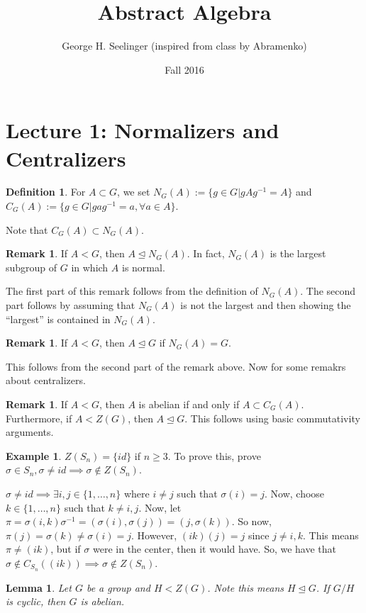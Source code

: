 \documentclass[11pt,leqno,oneside]{amsart}
\title[Abstract Algebra]{Abstract Algebra}
\author{George H. Seelinger (inspired from class by Abramenko)}
\date{Fall 2016}
\newcommand{\subgroup}{\mathrel{<}}
\newcommand{\normsubgroup}{\mathrel{\unlhd}}
\newtheorem{lem}[thm]{Lemma}
\theoremstyle{definition}
\newtheorem{defn}[thm]{Definition}
\newtheorem{example}[thm]{Example}
\newtheorem{rmk}[thm]{Remark}
\numberwithin{equation}{section}
\begin{document}
\maketitle
\section{Lecture 1: Normalizers and Centralizers}
\begin{defn}
    For $A \subset G$, we set $N_G(A) := \{g \in G | gAg^{-1} = A\}$ and
    $C_G(A) := \{g \in G | gag^{-1} = a, \forall a \in A\}$. 
\end{defn}
Note that $C_G(A) \subset N_G(A)$.
\begin{rmk}
    If $A \subgroup G$, then $A \normsubgroup N_G(A)$. In fact, $N_G(A)$ is the
    largest subgroup of $G$ in which $A$ is normal.
\end{rmk}
    The first part of this remark follows from the definition of $N_G(A)$. The
    second part follows by assuming that $N_G(A)$ is not the largest and then
    showing the ``largest'' is contained in $N_G(A)$.
\begin{rmk}
    If $A \subgroup G$, then $A \normsubgroup G$ if $N_G(A) = G$.
\end{rmk}
    This follows from the second part of the remark above.
    Now for some remakrs about centralizers.
    \begin{rmk}
        If $A \subgroup G$, then $A$ is abelian if and only if $A \subset
        C_G(A)$. Furthermore, if $A \subgroup Z(G)$, then $A \normsubgroup G$.
        This follows using basic commutativity arguments.
    \end{rmk}
    \begin{example}
        $Z(S_n) = \{ id \}$ if $n \geq 3$. To prove this, prove $\sigma \in S_n, \sigma \neq id \implies \sigma \notin Z(S_n)$. 

        $\sigma \neq id \implies \exists i,j \in \{1, \ldots, n\}$ where $i
        \neq j$ such that $\sigma(i) = j$. Now, choose $k \in \{1, \ldots, n\}$
        such that $k \neq i,j$. Now, let $\pi = \sigma(i,k)\sigma^{-1} =
        (\sigma(i), \sigma(j)) = (j, \sigma(k))$. So now, $\pi(j) = \sigma(k)
        \neq \sigma(i) = j$. However, $(ik)(j)=j$ since $j \neq i,k$. This
        means $\pi \neq (ik)$, but if $\sigma$ were in the center, then it
        would have. So, we have that $\sigma \notin C_{S_n}( (ik) ) \implies
        \sigma \notin Z(S_n)$.
    \end{example}
    \begin{lem}
        Let $G$ be a group and $H \subgroup Z(G)$. Note this means $H
        \normsubgroup G$. If $G/H$ is cyclic, then $G$ is abelian.
    \end{lem}
\end{document}
